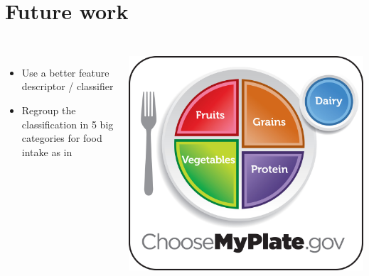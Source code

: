 \documentclass[aspectratio=169]{beamer}
\let\oldsection\section
\renewcommand{\section}[1]{
    \oldsection{#1}	
    \subsection{}
}
\newenvironment{myframe}[1][t]{\begin{frame}[#1]{\secname}{\subsecname}}{\end{frame}}
\begin{document}
    \section{Future work}
    
    \begin{myframe}
        \begin{columns}
            \renewcommand{\baselinestretch}{1.5}\normalsize
            \begin{itemize}
                \item Use a better feature descriptor / classifier
                
                \vspace{1cm}
                
                \item Regroup the classification in 5 big categories for food intake as in \cite{Aizawa2013}

            \end{itemize}
            \centering
            \includegraphics[scale=0.25]{../img/choosemyplate.jpg}
        \end{columns}
        
    \end{myframe}
    
\end{document}
